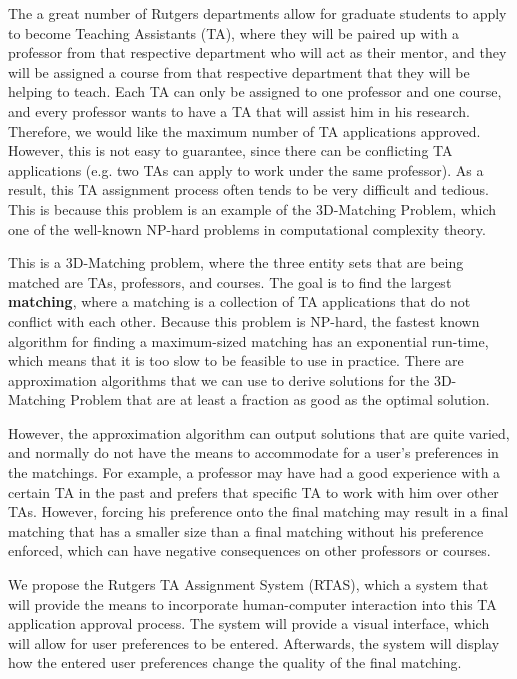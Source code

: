 The a great number of Rutgers departments allow for graduate students to apply to become Teaching Assistants (TA), where they will be paired up with a professor from that respective department who will act as their mentor, and they will be assigned a course from that respective department that they will be helping to teach. Each TA can only be assigned to one professor and one course, and every professor wants to have a TA that will assist him in his research. Therefore, we would like the maximum number of TA applications approved. However, this is not easy to guarantee, since there can be conflicting TA applications (e.g. two TAs can apply to work under the same professor). As a result, this TA assignment process often tends to be very difficult and tedious. This is because this problem is an example of the 3D-Matching Problem, which one of the well-known NP-hard problems in computational complexity theory. 

This is a 3D-Matching problem, where the three entity sets that are being matched are TAs, professors, and courses. The goal is to find the largest \textbf{matching}, where a matching is a collection of TA applications that do not conflict with each other. Because this problem is NP-hard, the fastest known algorithm for finding a maximum-sized matching has an exponential run-time, which means that it is too slow to be feasible to use in practice. There are approximation algorithms that we can use to derive solutions for the 3D-Matching Problem that are at least a fraction as good as the optimal solution. 

However, the approximation algorithm can output solutions that are quite varied, and normally do not have the means to accommodate for a user's preferences in the matchings. For example, a professor may have had a good experience with a certain TA in the past and prefers that specific TA to work with him over other TAs. However, forcing his preference onto the final matching may result in a final matching that has a smaller size than a final matching without his preference enforced, which can have negative consequences on other professors or courses. 

We propose the Rutgers TA Assignment System (RTAS), which a system that will provide the means to incorporate human-computer interaction into this TA application approval process. The system will provide a visual interface, which will allow for user preferences to be entered. Afterwards, the system will display how the entered user preferences change the quality of the final matching. 